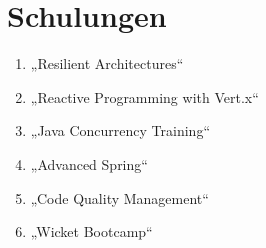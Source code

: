 \section*{Schulungen}
\begin{enumerate}[label=,leftmargin=0cm,itemsep=10pt]
\item „Resilient Architectures“
\item „Reactive Programming with Vert.x“
\item „Java Concurrency Training“
\item „Advanced Spring“
\item „Code Quality Management“
\item „Wicket Bootcamp“
\end{enumerate}
